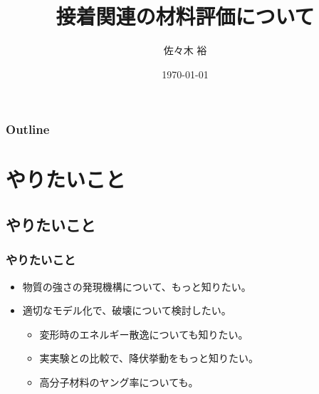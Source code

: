 \documentclass[1４pt, dvipdfmx]{beamer}
\title{接着関連の材料評価について}
\author[東亞合成　佐々木]{佐々木 裕}
\institute[東亞合成]{東亞合成株式会社}
\date{\today}
\begin{document}
\maketitle

\begin{frame}
\frametitle{Outline}
\tableofcontents
\end{frame}

\section{やりたいこと}

\subsection{やりたいこと}

\begin{frame}
	\frametitle{やりたいこと}
	\begin{itemize}
		\item 物質の強さの発現機構について、もっと知りたい。
		\item 適切なモデル化で、破壊について検討したい。
		\begin{itemize}
			\item 変形時のエネルギー散逸についても知りたい。
			\item 実実験との比較で、降伏挙動をもっと知りたい。
			\item 高分子材料のヤング率についても。
		\end{itemize}
	\end{itemize}
\end{frame}

\end{document}
